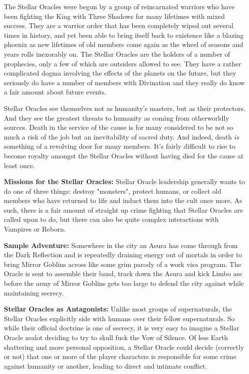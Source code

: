 The Stellar Oracles were begun by a group of reincarnated warriors who have been fighting the King with Three Shadows for many lifetimes with mixed success. They are a warrior order that has been completely wiped out several times in history, and yet been able to bring itself back to existence like a blazing phoenix as new lifetimes of old members come again as the wheel of seasons and years rolls inexorably on. The Stellar Oracles are the holders of a number of prophecies, only a few of which are outsiders allowed to see. They have a rather complicated dogma involving the effects of the planets on the future, but they seriously do have a number of members with Divination and they really do know a fair amount about future events.

Stellar Oracles see themselves not as humanity's masters, but as their protectors. And they see the greatest threats to humanity as coming from otherworldly sources. Death in the service of the cause is for many considered to be not so much a risk of the job but an inevitability of sacred duty. And indeed, death \textit{is} something of a revolving door for many members. It's fairly difficult to rise to become royalty amongst the Stellar Oracles without having died for the cause at least once.

\textbf{Missions for the Stellar Oracles:} Stellar Oracle leadership generally wants to do one of three things: destroy "monsters", protect humans, or collect old members who have returned to life and induct them into the cult once more. As such, there is a fair amount of straight up crime fighting that Stellar Oracles are called upon to do, but there can also be quite complex interactions with Vampires or Reborn.

\textbf{Sample Adventure:} Somewhere in the city an Asura has come through from the Dark Reflection and is repeatedly draining energy out of mortals in order to bring Mirror Goblins across like some grim parody of a work visa program. The Oracle is sent to assemble their band, track down the Asura and kick Limbo ass before the army of Mirror Goblins gets too large to defend the city against while maintaining secrecy.

\textbf{Stellar Oracles as Antagonists:} Unlike most groups of supernaturals, the Stellar Oracles explicitly side with humans over their fellow supernaturals. So while their official doctrine is one of secrecy, it is very easy to imagine a Stellar Oracle zealot deciding to try to skull fuck the Vow of Silence. Of less Earth shattering and more personal opposition, a Stellar Oracle could decide (correctly or not) that one or more of the player characters is responsible for some crime against humanity or another, leading to direct and intimate conflict.

